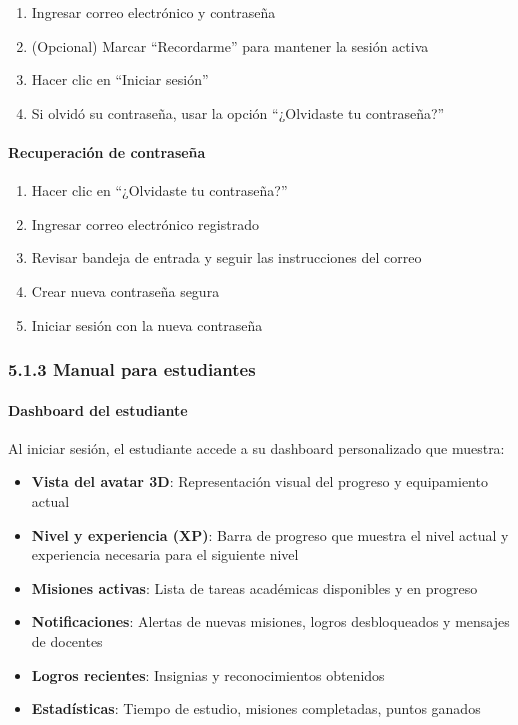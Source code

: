\begin{enumerate}
	\item Ingresar correo electrónico y contraseña
	\item (Opcional) Marcar ``Recordarme'' para mantener la sesión activa
	\item Hacer clic en ``Iniciar sesión''
	\item Si olvidó su contraseña, usar la opción ``¿Olvidaste tu contraseña?''
\end{enumerate}

\paragraph{Recuperación de contraseña}

\begin{enumerate}
	\item Hacer clic en ``¿Olvidaste tu contraseña?''
	\item Ingresar correo electrónico registrado
	\item Revisar bandeja de entrada y seguir las instrucciones del correo
	\item Crear nueva contraseña segura
	\item Iniciar sesión con la nueva contraseña
\end{enumerate}

\subsubsection{5.1.3 Manual para estudiantes}

\paragraph{Dashboard del estudiante}

Al iniciar sesión, el estudiante accede a su dashboard personalizado que muestra:

\begin{itemize}
	\item \textbf{Vista del avatar 3D}: Representación visual del progreso y equipamiento actual
	\item \textbf{Nivel y experiencia (XP)}: Barra de progreso que muestra el nivel actual y experiencia necesaria para el siguiente nivel
	\item \textbf{Misiones activas}: Lista de tareas académicas disponibles y en progreso
	\item \textbf{Notificaciones}: Alertas de nuevas misiones, logros desbloqueados y mensajes de docentes
	\item \textbf{Logros recientes}: Insignias y reconocimientos obtenidos
	\item \textbf{Estadísticas}: Tiempo de estudio, misiones completadas, puntos ganados
\end{itemize}

